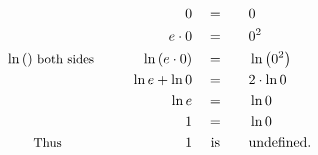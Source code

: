 \begin{alignat*}{5}
&\,&0\quad&=\quad&&0\\
&\,&e\cdot0\quad&=\quad&&0^2\\
&\small\ln{()}\text{ both sides}\qquad&\ln{(e\cdot0)}\quad&=&&\ln{\left(0^2\right)}\\
&\,&\ln{e+\ln{0}}\quad&=&&2\cdot\ln{0}\\
&\,&\ln{e}\quad&=&&\ln{0}\\
&\,&1\quad&=&&\ln{0}\\
&\qquad\small\text{Thus}&1\quad&\text{ is}&&\text{undefined.}
\end{alignat*}
